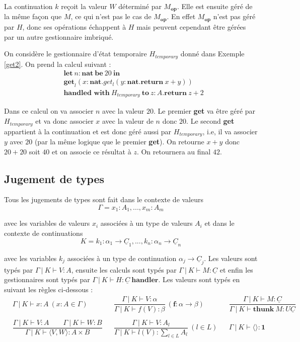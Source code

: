 	La continuation $k$ reçoit la valeur $W$ déterminé par $M_\textbf{op}$. Elle est ensuite géré de la même façon que $M$, ce qui n'est pas le cas de $M_\textbf{op}$. En effet $M_\textbf{op}$ n'est pas géré par $H$, donc ses opérations échappent à $H$ mais peuvent cependant être gérées par un autre gestionnaire imbriqué. 
	
	\begin{exemple}
		On considère le gestionnaire d'état temporaire $H_{temporary}$ donné dans Exemple \ref{get2}. On prend la calcul suivant :
		\begin{align*}
			& \textbf{let}~n:\textbf{nat}~\textbf{be}~20~\textbf{in}\\
			& \textbf{get}_l(x:\textbf{nat}.get_l(y:\textbf{nat}.\textbf{return}~x+y))\\
			&\textbf{handled~with}~H_{temporary}~\textbf{to}~z:A.\textbf{return}~z+2
		\end{align*}
	
	Dans ce calcul on va associer $n$ avec la valeur $20$. Le premier \textbf{get} va être géré par $H_{temporary}$ et va donc associer $x$ avec la valeur de $n$ donc $20$. Le second \textbf{get} appartient à la continuation et est donc géré aussi par $H_{temporary}$, i.e, il va associer $y$ avec $20$ (par la même logique que le premier \textbf{get}). On retourne $x + y$ donc $20 + 20$ soit $40$ et on associe ce résultat à $z$. On retournera au final $42$.
	\end{exemple}
	
\subsection{Jugement de types}

	Tous les jugements de types sont fait dans le contexte de valeurs
		\[\Gamma = x_1:A_1,...,x_m:A_m\]
		
	avec les variables de valeurs $x_i$ associées à un type de valeurs $A_i$ et dans le contexte de continuations
		\[K = k_1:\alpha_1 \rightarrow \underline{C}_1,...,k_n:\alpha_n \rightarrow \underline{C}_n\]
		
	avec les variables $k_j$ associées à un type de continuation $\alpha_j \rightarrow \underline{C}_j$. 
	\bigbreak
	Les valeurs sont typés par $\Gamma~|~K \vdash V:A$, ensuite les calculs sont typés par $\Gamma~|~K \vdash M:\underline{C}$ et enfin les gestionnaires sont typés par $\Gamma~|~K \vdash H:\underline{C}~\textbf{handler}$.
	\smallbreak 
	Les valeurs sont typés en suivant les règles ci-dessous : 
	\begin{align*}
		&\Gamma~|~K \vdash x:A~(x:A \in \Gamma) & &\dfrac{\Gamma~|~K \vdash V:\alpha}{\Gamma~|~K \vdash f(V):\beta}~(\textbf{f}:\alpha \rightarrow \beta) & &\dfrac{\Gamma~|~K \vdash M:\underline{C}}{\Gamma~|~K \vdash \textbf{thunk}~M:U\underline{C}}\\\\
		&\dfrac{\Gamma~|~K \vdash V:A\quad\quad\Gamma~|~K \vdash W:B}{\Gamma~|~K \vdash \langle V,W \rangle:A \times B} & &\dfrac{\Gamma~|~K \vdash V:A_l}{\Gamma~|~K \vdash l(V):\sum_{l \in L}A_l}~(l \in L) & &\Gamma~|~K \vdash \langle\rangle:\textbf{1}
	\end{align*}
	

